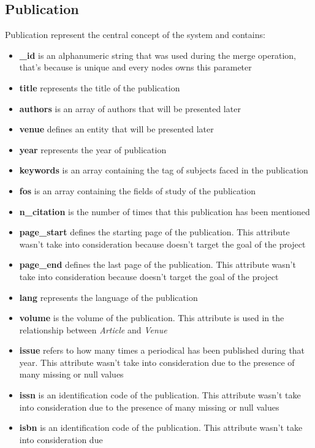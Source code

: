 \documentclass{Configuration_Files/PoliMi3i_thesis}
\begin{document}
\subsection{Publication}
Publication represent the central concept of the system and contains:
\begin{itemize}
    \item \textbf{\_id} is an alphanumeric string that was used during the merge operation, that's because is unique and
            every nodes owns this parameter
    \item \textbf{title} represents the title of the publication
    \item \textbf{authors} is an array of authors that will be presented later
    \item \textbf{venue} defines an entity that will be presented later
    \item \textbf{year} represents the year of publication
    \item \textbf{keywords} is an array containing the tag of subjects faced in the publication
    \item \textbf{fos} is an array containing the fields of study of the publication
    \item \textbf{n\_citation} is the number of times that this publication has been mentioned
    \item \textbf{page\_start} defines the starting page of the publication. This attribute wasn't take into consideration
            because doesn't target the goal of the project
    \item \textbf{page\_end} defines the last page of the publication. This attribute wasn't take into consideration
            because doesn't target the goal of the project
    \item \textbf{lang} represents the language of the publication
    \item \textbf{volume} is the volume of the publication. This attribute is used in the relationship between \emph{Article}
            and \emph{Venue}
    \item \textbf{issue} refers to how many times a periodical has been published during that year. This attribute 
            wasn't take into consideration due to the presence of many missing or null values
    \item \textbf{issn} is an identification code of the publication. This attribute wasn't take into consideration due
            to the presence of many missing or null values
    \item \textbf{isbn} is an identification code of the publication. This attribute wasn't take into consideration due

\end{itemize}
\end{document}

